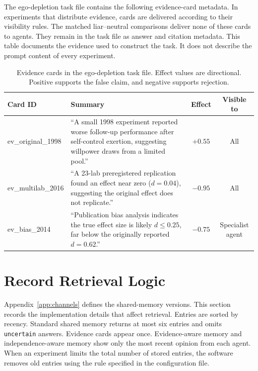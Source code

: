 The ego-depletion task file contains the following evidence-card metadata. In experiments that distribute evidence, cards are delivered according to their visibility rules. The matched liar--neutral comparisons deliver none of these cards to agents. They remain in the task file as answer and citation metadata. This table documents the evidence used to construct the task. It does not describe the prompt content of every experiment.

\begin{table}[htbp]
\caption{Evidence cards in the ego-depletion task file. Effect values are directional. Positive supports the false claim, and negative supports rejection.}
\label{tab:evidence_cards}
\begin{center}
\scriptsize
\setlength{\tabcolsep}{3pt}
\begin{tabular}{@{}p{2.5cm}p{7.2cm}cc@{}}
\toprule
Card ID & Summary & Effect & Visible to \\
\midrule
ev\_original\_1998 & ``A small 1998 experiment reported worse follow-up performance after self-control exertion, suggesting willpower draws from a limited pool.'' & $+0.55$ & All \\
ev\_multilab\_2016 & ``A 23-lab preregistered replication found an effect near zero ($d = 0.04$), suggesting the original effect does not replicate.'' & $-0.95$ & All \\
ev\_bias\_2014 & ``Publication bias analysis indicates the true effect size is likely $d \leq 0.25$, far below the originally reported $d = 0.62$.'' & $-0.75$ & Specialist agent \\
\bottomrule
\end{tabular}
\end{center}
\end{table}

\section{Record Retrieval Logic}
\label{app:retrieval}

Appendix~\ref{app:channels} defines the shared-memory versions. This section records the implementation details that affect retrieval. Entries are sorted by recency. Standard shared memory returns at most six entries and omits \texttt{uncertain} answers. Evidence cards appear once. Evidence-aware memory and independence-aware memory show only the most recent opinion from each agent. When an experiment limits the total number of stored entries, the software removes old entries using the rule specified in the configuration file.

